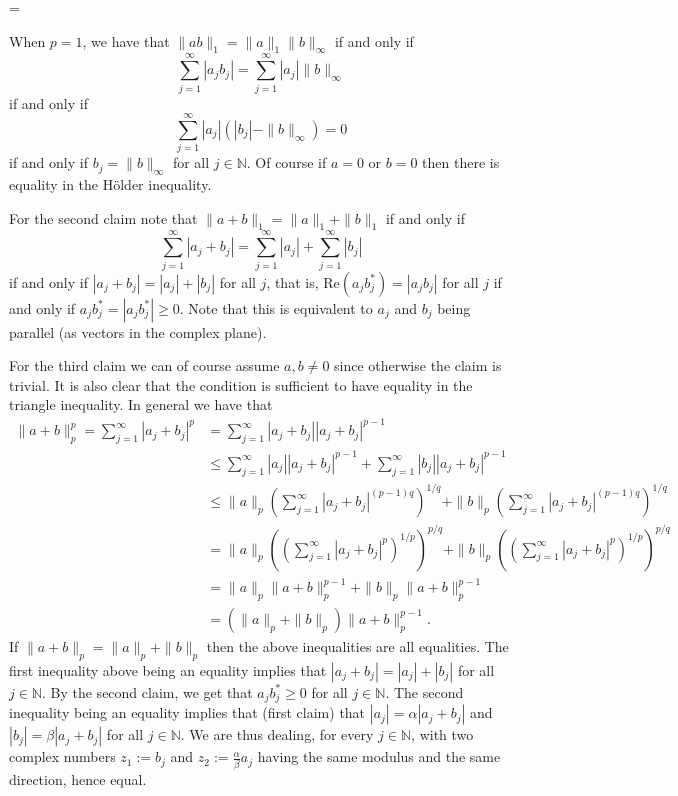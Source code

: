 \documentclass[a4paper]{article}
\makeatletter
\newcommand{\N}{{\mathbb N}}
\newcommand{\re}{\mathrm{Re}}
\newif\ifsolutions
\newenvironment{solution}%
{%
\ifsolutions\par\noindent\color{gray}\normalfont\textbf{Solution.}
\else\setbox0=\vbox\bgroup\color@begingroup\fi
}{%
\ifsolutions
\else\color@endgroup\egroup\fi
}%
\makeatother
\begin{document}
\begin{enumerate}
\begin{solution}
When $p=1$, we have that $\|a b\|_1 = \|a\|_1 \|b\|_\infty$ if and only if 
\[ \sum_{j=1}^{\infty} |a_j b_j| = \sum_{j=1}^\infty |a_j| \|b\|_\infty \]
if and only if
\[ \sum_{j=1}^{\infty} |a_j|(|b_j|-\|b\|_\infty) =0\]
if and only if $b_j=\|b\|_\infty$ for all $j \in \N$. Of course if $a=0$ or $b=0$ then there is equality in the H\"older inequality.


For the second claim note that $\|a + b\|_1 = \|a\|_1+\|b\|_1$ if and only if
\[ \sum_{j=1}^{\infty} |a_j+b_j| = \sum_{j=1}^{\infty}|a_j| + \sum_{j=1}^{\infty}|b_j|\]
if and only if $|a_j+b_j|=|a_j|+|b_j|$ for all $j$, that is, $\re(a_j b_j^*)=|a_j b_j|$ for all $j$ if and only if $a_jb_j^*=|a_jb_j^*| \ge 0$. Note that this is equivalent to
$a_j$ and $b_j$ being parallel (as vectors in the complex plane).

For the third claim we can of course assume $a,b\ne 0$ since otherwise the claim is trivial. It is also clear that the condition is sufficient to have equality in the triangle inequality.
In general we have that
\begin{align*}
 \|a+b\|_p^p = \sum_{j=1}^{\infty} |a_j+b_j|^p &= \sum_{j=1}^{\infty} |a_j+b_j| |a_j+b_j|^{p-1} \\
 &\le  \sum_{j=1}^{\infty} |a_j| |a_j+b_j|^{p-1} + \sum_{j=1}^{\infty} |b_j| |a_j+b_j|^{p-1} \\
 & \le \|a\|_p \left ( \sum_{j=1}^\infty |a_j+b_j|^{(p-1)q} \right )^{1/q} +\|b\|_p \left ( \sum_{j=1}^\infty |a_j+b_j|^{(p-1)q} \right )^{1/q} \\
 & = \|a\|_p \left (\left ( \sum_{j=1}^\infty |a_j+b_j|^{p} \right )^{1/p} \right )^{p/q} +\|b\|_p \left ( \left ( \sum_{j=1}^\infty |a_j+b_j|^{p} \right )^{1/p}  \right )^{p/q}\\
 & = \|a\|_p \|a+b\|_p^{p-1} + \|b\|_p \|a+b\|_p^{p-1} \\
 & = (\|a\|_p + \|b\|_p) \|a+b\|_p^{p-1}.
 \end{align*}
If $\|a+b\|_p = \|a\|_p + \|b\|_p$ then the above inequalities are all equalities. The first inequality above being an equality implies that $|a_j+b_j|=|a_j|+ |b_j|$ for all $j \in \N$. By the second claim, we get that $a_j b_j^* \ge 0$ for all $j \in \N$. The second inequality being an equality implies that (first claim) that $|a_j|= \alpha |a_j+b_j|$ and $|b_j|=\beta |a_j+b_j|$ for all $j \in \N$. We are thus dealing, for every $j \in \N$, with two complex numbers $z_1:=b_j$ and $z_2:= \frac{\alpha}{\beta} a_j$ having the same modulus and the same direction, hence equal.
\end{solution}


\end{enumerate}
\end{document}
